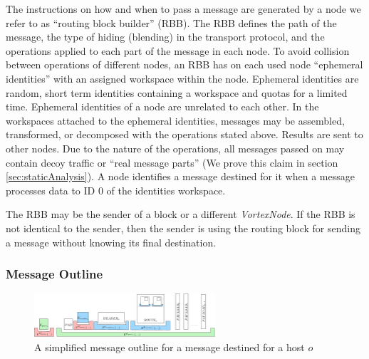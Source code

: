 \documentclass[acmsmall, screen]{acmart}
\begin{document}
The instructions on how and when to pass a message are generated by a node we refer to as ``routing block builder'' (RBB). The RBB defines the path of the message, the type of hiding (blending) in the transport protocol, and the operations applied to each part of the message in each node. To avoid collision between operations of different nodes, an RBB has on each used node ``ephemeral identities'' with an assigned workspace within the node. Ephemeral identities are random, short term identities containing a workspace and quotas for a limited time. Ephemeral identities of a node are unrelated to each other. In the workspaces attached to the ephemeral identities, messages may be assembled, transformed, or decomposed with the operations stated above. Results are sent to other nodes. Due to the nature of the operations, all messages passed on may contain decoy traffic or ``real message parts'' (We prove this claim in section \ref{sec:staticAnalysis}). A node identifies a message destined for it when a message processes data to ID 0 of the identities workspace.

The RBB may be the sender of a block or a different \emph{VortexNode}. If the RBB is not identical to the sender, then the sender is using the routing block for sending a message without knowing its final destination.

\subsubsection{Message Outline\label{sec:messageOutline}}
\begin{figure}[ht]
	\centering\includegraphics[width=0.6\textwidth]{../../inc/blockLayoutSimplified}
	\caption{A simplified message outline for a message destined for a host $o$}
	\label{fig:messageOutline}
\end{figure}

\end{document}
